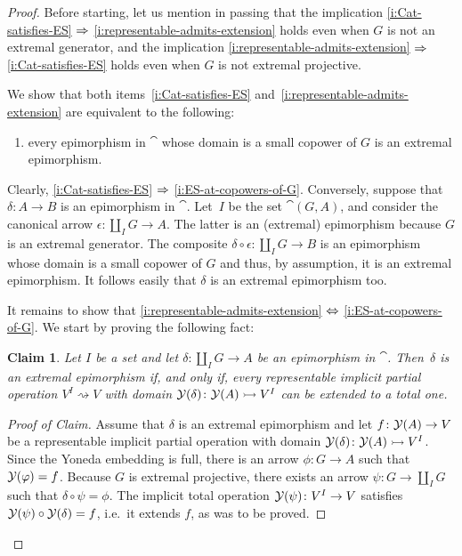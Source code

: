 \documentclass[a4paper,10pt,reqno]{amsart}
\newtheorem{claim}[theorem]{Claim}
\theoremstyle{definition}
\theoremstyle{remark}
\begin{document}
\begin{proof}
Before starting, let us mention in passing that the implication \ref{i:Cat-satisfies-ES} $\Rightarrow$ \ref{i:representable-admits-extension} holds even when $G$ is not an extremal generator, and the implication \ref{i:representable-admits-extension} $\Rightarrow$ \ref{i:Cat-satisfies-ES} holds even when $G$ is not extremal projective. 

We show that both items~\ref{i:Cat-satisfies-ES} and~\ref{i:representable-admits-extension} are equivalent to the following: 
\begin{enumerate}[label=(\arabic*),resume=implicitops]
\item\label{i:ES-at-copowers-of-G} every epimorphism in $\cat$ whose domain is a small copower of $G$ is an extremal epimorphism.
\end{enumerate}

Clearly, \ref{i:Cat-satisfies-ES} $\Rightarrow$ \ref{i:ES-at-copowers-of-G}. Conversely, suppose that $\delta\colon A\to B$ is an epimorphism in $\cat$. Let~$I$ be the set $\cat(G,A)$, and consider the canonical arrow $\epsilon\colon \coprod_{I}G \to A$. The latter is an (extremal) epimorphism because $G$ is an extremal generator. The composite $\delta\circ \epsilon \colon \coprod_{I}G \to B$ is an epimorphism whose domain is a small copower of $G$ and thus, by assumption, it is an extremal epimorphism. It follows easily that $\delta$ is an extremal epimorphism too.

It remains to show that \ref{i:representable-admits-extension} $\Leftrightarrow$ \ref{i:ES-at-copowers-of-G}. We start by proving the following fact:
%
\begin{claim}\label{claim:ext-epi-iff-total}
Let $I$ be a set and let $\delta\colon \coprod_{I}G \to A$ be an epimorphism in $\cat$. Then~$\delta$ is an extremal epimorphism if, and only if, every representable implicit partial operation $V^{I} \rightsquigarrow V$ with domain $\mathcal{Y}(\delta)\colon \mathcal{Y}(A)\rightarrowtail V^{I}$ can be extended to a total one.
\end{claim}
%
\begin{proof}[Proof of Claim]
Assume that $\delta$ is an extremal epimorphism and let $f\colon \mathcal{Y}(A)\to V$ be a representable implicit partial operation with domain $\mathcal{Y}(\delta)\colon \mathcal{Y}(A)\rightarrowtail V^{I}$. Since the Yoneda embedding is full, there is an arrow $\phi\colon G\to A$ such that $\mathcal{Y}(\varphi)=f$. Because $G$ is extremal projective, there exists an arrow $\psi\colon G\to \coprod_{I}{G}$ such that $\delta\circ \psi = \phi$. The implicit total operation $\mathcal{Y}(\psi)\colon V^{I}\to V$ satisfies $\mathcal{Y}(\psi)\circ \mathcal{Y}(\delta) = f$, i.e.\ it extends $f$, as was to be proved.


\end{proof}
\end{proof}
\end{document}
